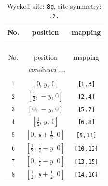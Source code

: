 \documentclass[fleqn,8pt]{jsarticle}
\begin{document}
\renewcommand{\arraystretch}{1.2}
\begin{longtable}{ccc}
\caption{Wyckoff site: {\tt 8g}, site symmetry: {\tt .2.}}
 \\
 \hline \hline
No. & position & mapping \\ \hline \endfirsthead

\multicolumn{2}{l}{\tablename\ \thetable{}} \\
 \hline \hline
No. & position & mapping \\ \hline \endhead

 \hline \hline
\multicolumn{2}{r}{\footnotesize\it continued ...} \\ \endfoot

 \hline \hline
\multicolumn{2}{r}{} \\ \endlastfoot

1 & $\left[ 0,\, y,\, 0 \right]$ & {\tt [1,3]} \\ \hline
2 & $\left[ \frac{1}{2},\, - y,\, 0 \right]$ & {\tt [2,4]} \\ \hline
3 & $\left[ 0,\, - y,\, 0 \right]$ & {\tt [5,7]} \\ \hline
4 & $\left[ \frac{1}{2},\, y,\, 0 \right]$ & {\tt [6,8]} \\ \hline
5 & $\left[ 0,\, y + \frac{1}{2},\, 0 \right]$ & {\tt [9,11]} \\ \hline
6 & $\left[ \frac{1}{2},\, \frac{1}{2} - y,\, 0 \right]$ & {\tt [10,12]} \\ \hline
7 & $\left[ 0,\, \frac{1}{2} - y,\, 0 \right]$ & {\tt [13,15]} \\ \hline
8 & $\left[ \frac{1}{2},\, y + \frac{1}{2},\, 0 \right]$ & {\tt [14,16]} \\
\end{longtable}
\renewcommand{\arraystretch}{1.2}
\end{document}
